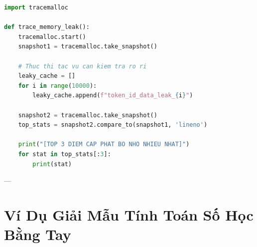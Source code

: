 \begin{lstlisting}[language=Python]
import tracemalloc

def trace_memory_leak():
    tracemalloc.start()
    snapshot1 = tracemalloc.take_snapshot()
    
    # Thuc thi tac vu can kiem tra ro ri
    leaky_cache = []
    for i in range(10000):
        leaky_cache.append(f"token_id_data_leak_{i}")
        
    snapshot2 = tracemalloc.take_snapshot()
    top_stats = snapshot2.compare_to(snapshot1, 'lineno')
    
    print("[TOP 3 DIEM CAP PHAT BO NHO NHIEU NHAT]")
    for stat in top_stats[:3]:
        print(stat)
\end{lstlisting}

---

\section{Ví Dụ Giải Mẫu Tính Toán Số Học Bằng Tay}
\label{sec:ch02-numerical-walkthrough}

